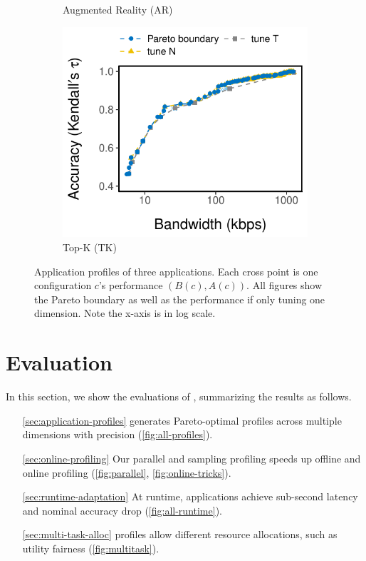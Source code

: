 \begin{figure}[htb]
\begin{subfigure}[t]{0.32\textwidth}
    \caption{Augmented Reality (AR)}
    \label{fig:ar-profile}
  \end{subfigure}
  \hfill
  \begin{subfigure}[t]{0.32\textwidth}
    \centering
    \includegraphics[width=\textwidth]{figures/profile-topk.pdf}
    \caption{Top-K (TK)}
    \label{fig:tk-profile}
  \end{subfigure}
  \caption{Application profiles of three applications. Each cross point is one
    configuration $c$'s performance $(B(c), A(c))$. All figures show the Pareto
    boundary as well as the performance if only tuning one dimension. Note the
    x-axis is in log scale.}
  \label{fig:all-profiles}
\end{figure}

\section{Evaluation}
\label{sec:evaluation}

In this section, we show the evaluations of \sysname{}, summarizing the results
as follows.

\begin{itemize}
\item[\autoref{sec:application-profiles}] \sysname{} generates Pareto-optimal
  profiles across multiple dimensions with precision
  (\autoref{fig:all-profiles}).
\item[\autoref{sec:online-profiling}] Our parallel and sampling profiling speeds
  up offline and online profiling (\autoref{fig:parallel},
  \autoref{fig:online-tricks}).
\item[\autoref{sec:runtime-adaptation}] At runtime, \sysname{} applications
  achieve sub-second latency and nominal accuracy drop
  (\autoref{fig:all-runtime}).
\item[\autoref{sec:multi-task-alloc}] \sysname{} profiles allow different
  resource allocations, such as utility fairness (\autoref{fig:multitask}).
\end{itemize}

